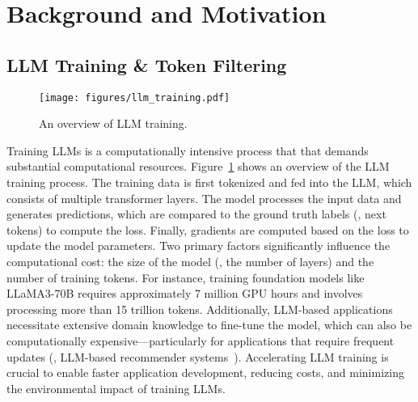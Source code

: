\section{Background and Motivation} \label{sec:background_motivation}

\subsection{LLM Training \& Token Filtering} \label{sec:background_llm}

\begin{figure}[t]
	\centering
	\texttt{[image: figures/llm\_training.pdf]}
	\caption{An overview of LLM training.}
	\label{fig:llm_training}
\end{figure}

Training LLMs is a computationally intensive process that that demands substantial computational resources. Figure~\ref{fig:llm_training} shows an overview of the LLM training process. The training data is first tokenized and fed into the LLM, which consists of multiple transformer layers. The model processes the input data and generates predictions, which are compared to the ground truth labels (\ie, next tokens) to compute the loss. Finally, gradients are computed based on the loss to update the model parameters. 
Two primary factors significantly influence the computational cost: the size of the model (\eg, the number of layers) and the number of training tokens. For instance, training foundation models like LLaMA3-70B requires approximately 7 million GPU hours and involves processing more than 15 trillion tokens. Additionally, LLM-based applications necessitate extensive domain knowledge to fine-tune the model, which can also be computationally expensive—particularly for applications that require frequent updates (\eg, LLM-based recommender systems~\cite{DBLP:conf/sigir/LinWLYFWC24}).
Accelerating LLM training is crucial to enable faster application development, reducing costs, and minimizing the environmental impact of training LLMs.

